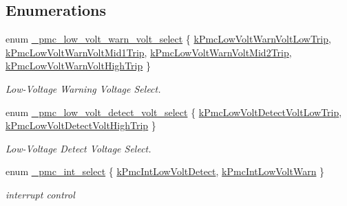 \subsection*{Enumerations}
\begin{DoxyCompactItemize}
\item 
enum \hyperlink{group__pmc__hal_ga9d145bde5873dd08a865c2b997612cc3}{\+\_\+pmc\+\_\+low\+\_\+volt\+\_\+warn\+\_\+volt\+\_\+select} \{ \hyperlink{group__pmc__hal_gga9d145bde5873dd08a865c2b997612cc3acd58badaf43b0fa033b4b1ebd6827a9c}{k\+Pmc\+Low\+Volt\+Warn\+Volt\+Low\+Trip}, 
\hyperlink{group__pmc__hal_gga9d145bde5873dd08a865c2b997612cc3aba6eece71de36d8fc75d6e78f2cc1eb4}{k\+Pmc\+Low\+Volt\+Warn\+Volt\+Mid1\+Trip}, 
\hyperlink{group__pmc__hal_gga9d145bde5873dd08a865c2b997612cc3a9a9b26a77756a99396b1c52041fed0fd}{k\+Pmc\+Low\+Volt\+Warn\+Volt\+Mid2\+Trip}, 
\hyperlink{group__pmc__hal_gga9d145bde5873dd08a865c2b997612cc3aced1703464157abb71299cfaffd7e760}{k\+Pmc\+Low\+Volt\+Warn\+Volt\+High\+Trip}
 \}\begin{DoxyCompactList}\small\item\em Low-\/\+Voltage Warning Voltage Select. \end{DoxyCompactList}
\item 
enum \hyperlink{group__pmc__hal_ga48ebafb1e112fd0af6390e5d049ec133}{\+\_\+pmc\+\_\+low\+\_\+volt\+\_\+detect\+\_\+volt\+\_\+select} \{ \hyperlink{group__pmc__hal_gga48ebafb1e112fd0af6390e5d049ec133a3bfd7f356d52310331bfe935c4e08793}{k\+Pmc\+Low\+Volt\+Detect\+Volt\+Low\+Trip}, 
\hyperlink{group__pmc__hal_gga48ebafb1e112fd0af6390e5d049ec133a4e3fcb4bbf4db4112e2cb31638d52796}{k\+Pmc\+Low\+Volt\+Detect\+Volt\+High\+Trip}
 \}\begin{DoxyCompactList}\small\item\em Low-\/\+Voltage Detect Voltage Select. \end{DoxyCompactList}
\item 
enum \hyperlink{group__pmc__hal_ga9b861bcdeda11a0e03077a7b913a3cb0}{\+\_\+pmc\+\_\+int\+\_\+select} \{ \hyperlink{group__pmc__hal_gga9b861bcdeda11a0e03077a7b913a3cb0a34a1bb342d05a096d4ce192648017bce}{k\+Pmc\+Int\+Low\+Volt\+Detect}, 
\hyperlink{group__pmc__hal_gga9b861bcdeda11a0e03077a7b913a3cb0a1e35de32d0a83ff65b0c7e2986af3291}{k\+Pmc\+Int\+Low\+Volt\+Warn}
 \}\begin{DoxyCompactList}\small\item\em interrupt control \end{DoxyCompactList}
\end{DoxyCompactItemize}

